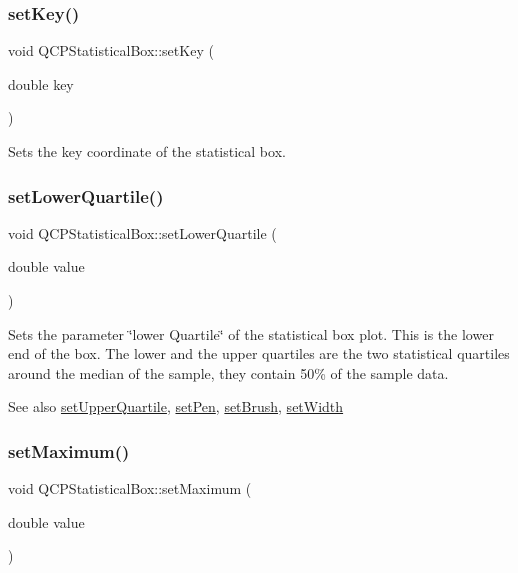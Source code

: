 \subsubsection{\texorpdfstring{set\+Key()}{setKey()}}
{\footnotesize\ttfamily void Q\+C\+P\+Statistical\+Box\+::set\+Key (\begin{DoxyParamCaption}\item[{double}]{key }\end{DoxyParamCaption})}

Sets the key coordinate of the statistical box. \hypertarget{class_q_c_p_statistical_box_a680941af5e23d902013962fa67223f9e}{}\label{class_q_c_p_statistical_box_a680941af5e23d902013962fa67223f9e} 
\subsubsection{\texorpdfstring{set\+Lower\+Quartile()}{setLowerQuartile()}}
{\footnotesize\ttfamily void Q\+C\+P\+Statistical\+Box\+::set\+Lower\+Quartile (\begin{DoxyParamCaption}\item[{double}]{value }\end{DoxyParamCaption})}

Sets the parameter \char`\"{}lower Quartile\char`\"{} of the statistical box plot. This is the lower end of the box. The lower and the upper quartiles are the two statistical quartiles around the median of the sample, they contain 50\% of the sample data.

\begin{DoxySeeAlso}{See also}
\hyperlink{class_q_c_p_statistical_box_a65a1375f941c5a2077b5201229e89346}{set\+Upper\+Quartile}, \hyperlink{class_q_c_p_abstract_plottable_ab74b09ae4c0e7e13142fe4b5bf46cac7}{set\+Pen}, \hyperlink{class_q_c_p_abstract_plottable_a7a4b92144dca6453a1f0f210e27edc74}{set\+Brush}, \hyperlink{class_q_c_p_statistical_box_a0b62775bd67301b1eba5c785f2b26f14}{set\+Width} 
\end{DoxySeeAlso}
\hypertarget{class_q_c_p_statistical_box_acec5ad1901f00f2c5387cfb4d9787eb3}{}\label{class_q_c_p_statistical_box_acec5ad1901f00f2c5387cfb4d9787eb3} 
\subsubsection{\texorpdfstring{set\+Maximum()}{setMaximum()}}
{\footnotesize\ttfamily void Q\+C\+P\+Statistical\+Box\+::set\+Maximum (\begin{DoxyParamCaption}\item[{double}]{value }\end{DoxyParamCaption})}

